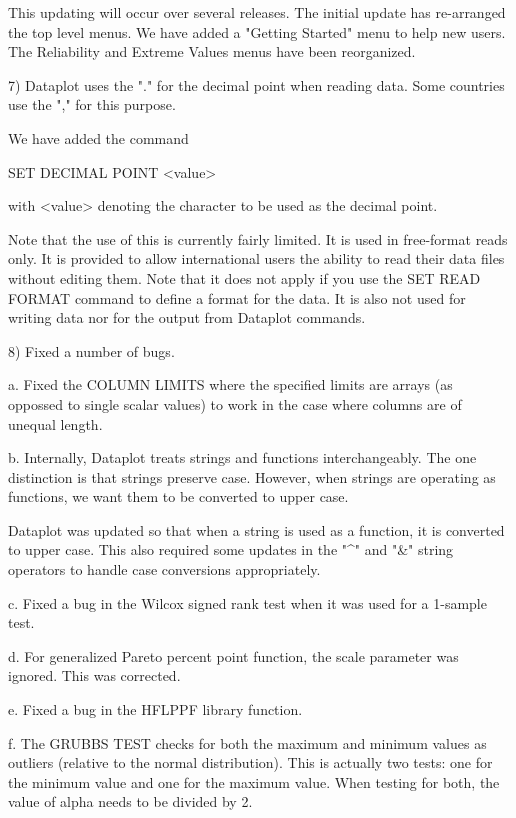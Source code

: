 {    This updating will occur over several releases.  The initial
    update has re-arranged the top level menus.  We have added
    a "Getting Started" menu to help new users.  The Reliability
    and Extreme Values menus have been reorganized.

 7) Dataplot uses the "." for the decimal point when reading data.
    Some countries use the "," for this purpose.

    We have added the command

       SET DECIMAL POINT <value>

    with <value> denoting the character to be used as the decimal
    point.

    Note that the use of this is currently fairly limited.  It is
    used in free-format reads only.  It is provided to allow
    international users the ability to read their data files
    without editing them.  Note that it does not apply if you
    use the SET READ FORMAT command to define a format for the
    data.  It is also not used for writing data nor for the
    output from Dataplot commands.

 8) Fixed a number of bugs.

    a. Fixed the COLUMN LIMITS where the specified limits are
       arrays (as oppossed to single scalar values) to work in
       the case where columns are of unequal length.

    b. Internally, Dataplot treats strings and functions
       interchangeably.  The one distinction is that strings
       preserve case.  However, when strings are operating as
       functions, we want them to be converted to upper case.

       Dataplot was updated so that when a string is used as a
       function, it is converted to upper case.  This also
       required some updates in the "^" and "&" string operators
       to handle case conversions appropriately.

    c. Fixed a bug in the Wilcox signed rank test when it was
       used for a 1-sample test.

    d. For generalized Pareto percent point function, the scale
       parameter was ignored.  This was corrected.

    e. Fixed a bug in the HFLPPF library function.

    f. The GRUBBS TEST checks for both the maximum and minimum
       values as outliers (relative to the normal distribution).
       This is actually two tests: one for the minimum value and
       one for the maximum value.  When testing for both, the
       value of alpha needs to be divided by 2.

}
